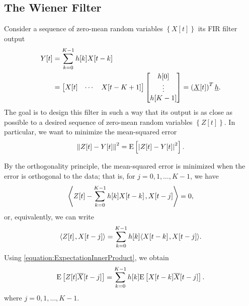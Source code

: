 \subsection{The Wiener Filter}

Consider a sequence of zero-mean random variables $\left\{ X[t] \right\}$ its FIR filter output
\begin{equation*}
\begin{split}
Y[t] &= \sum_{k=0}^{K-1} h[k] X[t - k] \\
&= \begin{bmatrix} X[t] & \cdots & X[t-K+1] \end{bmatrix}
\begin{bmatrix} h[0] \\ \vdots \\ h[K-1] \end{bmatrix}
= \left( \underline{X}[t] \right)^T \underline{h} .
\end{split}
\end{equation*}
The goal is to design this filter in such a way that its output is as close as possible to a desired sequence of zero-mean random variables $\left\{ Z[t] \right\}$.
In particular, we want to minimize the mean-squared error
\begin{equation*}
\left\| Z[t] - Y[t] \right\|^2
= \mathrm{E} \left[ \left| Z[t] - Y[t] \right|^2 \right].
\end{equation*}

By the orthogonality principle, the mean-squared error is minimized when the error is orthogonal to the data; that is, for $j = 0, 1, \ldots, K-1$, we have
\begin{equation*}
{\left\langle  Z[t] - \sum_{k=0}^{K-1} h[k] X[t - k]  \mskip2mu ,  X[t - j]  \right\rangle} = 0,
\end{equation*}
or, equivalently, we can write
\begin{equation*}
{\left\langle  Z[t]  \mskip2mu ,  X[t - j]  \right\rangle}
= \sum_{k=0}^{K-1} h[k] {\left\langle  X[t - k]  \mskip2mu ,  X[t - j]  \right\rangle} .
\end{equation*}
Using \eqref{equation:ExpectationInnerProduct}, we obtain
\begin{equation} \label{equation:WienerHopfConditions}
\mathrm{E} \left[ Z[t] \overline{X}[t - j] \right]
= \sum_{k=0}^{K-1} h[k] \mathrm{E} \left[ X[t - k] \overline{X}[t - j] \right] .
\end{equation}
where $j = 0, 1, \ldots, K-1$.

